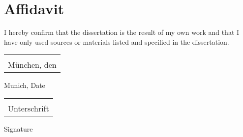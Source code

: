 \chapter*{Affidavit}

%

\vspace{10pt}

I hereby confirm that the dissertation \textbf{\myTitle} is the result of my own work and that I have only used sources or materials listed and specified in the dissertation.\vspace{10pt}


\vspace{60pt}

\newcommand{\sign}[1]{%
  \begin{tabular}[t]{@{}l@{}}
  \makebox[1.5in]{\dotfill}\\
  \strut#1\strut
  \end{tabular}%
}
  \begin{minipage}[t]{0.5\linewidth}
    \sign{München, den}
    \par 
    Munich, Date
  \end{minipage}
  \begin{minipage}[t]{0.5\linewidth}
    \raggedright
    \sign{Unterschrift}
    \par
    Signature
  \end{minipage}%

\newpage